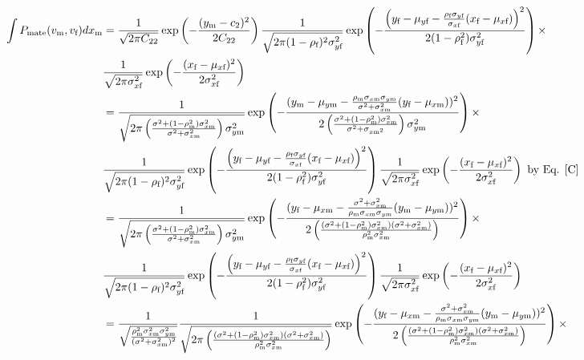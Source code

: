 \documentclass{article}
\newcommand{\x}[1]{\text{#1}}
\begin{document}
\begin{pf}
\begin{enumerate}
 \begin{align*}
\int P_\text{mate}(v_\x{m},v_\x{f})dx_\x{m}&=\frac{1}{\sqrt{2\pi C_{22}}}\exp\left(-\frac{(y_\x{m}-c_2)^2}{2C_{22}}\right)\frac{1}{\sqrt{2\pi(1-\rho_\x{f})^2\sigma_{y\x{f}}^2}}\exp\left(-\frac{\left(y_\x{f}-\mu_{y\x{f}}-\frac{\rho_\x{f}\sigma_{y\x{f}}}{\sigma_{x\x{f}}}(x_\x{f}-\mu_{x\x{f}})\right)^2}{2(1-\rho_\x{f}^2)\sigma_{y\x{f}}^2}\right)\times
\\&\frac{1}{\sqrt{2\pi\sigma_{x\x{f}}^2}}\exp\left(-\frac{(x_\x{f}-\mu_{x\x{f}})^2}{2\sigma_{x\x{f}}^2}\right)
\\&=\frac{1}{\sqrt{2\pi \left(\frac{\sigma^2+(1-\rho_\x{m}^2)\sigma_{x\x{m}}^2}{\sigma^2+\sigma_{x\x{m}}^2}\right)\sigma_{y\x{m}}^2}}\exp\left(-\frac{(y_\x{m}-\mu_{y\x{m}}-\frac{\rho_\x{m}\sigma_{x\x{m}}\sigma_{y\x{m}}}{\sigma^2+\sigma_{x\x{m}}^2}(y_\x{f}-\mu_{x\x{m}}))^2}{2\left(\frac{\sigma^2+(1-\rho_\x{m}^2)\sigma_{x\x{m}}^2}{\sigma^2+\sigma_{x\x{m}^2}}\right)\sigma_{y\x{m}}^2}\right)\times
\\&\frac{1}{\sqrt{2\pi(1-\rho_\x{f})^2\sigma_{y\x{f}}^2}}\exp\left(-\frac{\left(y_\x{f}-\mu_{y\x{f}}-\frac{\rho_\x{f}\sigma_{y\x{f}}}{\sigma_{x\x{f}}}(x_\x{f}-\mu_{x\x{f}})\right)^2}{2(1-\rho_\x{f}^2)\sigma_{y\x{f}}^2}\right)\frac{1}{\sqrt{2\pi\sigma_{x\x{f}}^2}}\exp\left(-\frac{(x_\x{f}-\mu_{x\x{f}})^2}{2\sigma_{x\x{f}}^2}\right) \text{ by Eq. \ref{C}}
\\&=\frac{1}{\sqrt{2\pi \left(\frac{\sigma^2+(1-\rho_\x{m}^2)\sigma_{x\x{m}}^2}{\sigma^2+\sigma_{x\x{m}}^2}\right)\sigma_{y\x{m}}^2}}\exp\left(-\frac{(y_\x{f}-\mu_{x\x{m}}-\frac{\sigma^2+\sigma_{x\x{m}}^2}{\rho_\x{m}\sigma_{x\x{m}}\sigma_{y\x{m}}}(y_\x{m}-\mu_{y\x{m}}))^2}{2\left(\frac{(\sigma^2+(1-\rho_\x{m}^2)\sigma_{x\x{m}}^2)(\sigma^2+\sigma_{x\x{m}}^2)}{\rho_\x{m}^2\sigma_{x\x{m}}^2}\right)}\right)\times
\\&\frac{1}{\sqrt{2\pi(1-\rho_\x{f})^2\sigma_{y\x{f}}^2}}\exp\left(-\frac{\left(y_\x{f}-\mu_{y\x{f}}-\frac{\rho_\x{f}\sigma_{y\x{f}}}{\sigma_{x\x{f}}}(x_\x{f}-\mu_{x\x{f}})\right)^2}{2(1-\rho_\x{f}^2)\sigma_{y\x{f}}^2}\right)\frac{1}{\sqrt{2\pi\sigma_{x\x{f}}^2}}\exp\left(-\frac{(x_\x{f}-\mu_{x\x{f}})^2}{2\sigma_{x\x{f}}^2}\right)
\\&=\frac{1}{\sqrt{\frac{\rho_\x{m}^2\sigma_{x\x{m}}^2\sigma_{y\x{m}}^2}{(\sigma^2+\sigma_{x\x{m}}^2)^2}}}\frac{1}{\sqrt{2\pi \left(\frac{(\sigma^2+(1-\rho_\x{m}^2)\sigma_{x\x{m}}^2)(\sigma^2+\sigma_{x\x{m}}^2)}{\rho_\x{m}^2\sigma_{x\x{m}}^2}\right)}}\exp\left(-\frac{(y_\x{f}-\mu_{x\x{m}}-\frac{\sigma^2+\sigma_{x\x{m}}^2}{\rho_\x{m}\sigma_{x\x{m}}\sigma_{y\x{m}}}(y_\x{m}-\mu_{y\x{m}}))^2}{2\left(\frac{(\sigma^2+(1-\rho_\x{m}^2)\sigma_{x\x{m}}^2)(\sigma^2+\sigma_{x\x{m}}^2)}{\rho_\x{m}^2\sigma_{x\x{m}}^2}\right)}\right)\times

\end{align*}
\end{enumerate}
\end{pf}
\end{document}

